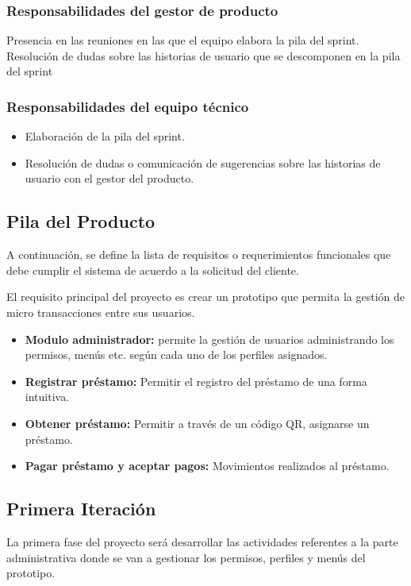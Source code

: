{{		\subsubsection{Responsabilidades del gestor de producto}
		{Presencia en las reuniones en las que el equipo elabora la pila del sprint. Resolución de dudas sobre las historias de usuario que se descomponen en la pila del sprint}
		
		\subsubsection{Responsabilidades del equipo técnico}
			\begin{itemize}
				\item Elaboración de la pila del sprint.
				\item Resolución de dudas o comunicación de sugerencias sobre las historias de usuario con el gestor del producto.
			\end{itemize}
	}

	\subsection{Pila del Producto}
	{A continuación, se define la lista de requisitos o requerimientos funcionales que debe cumplir el sistema de acuerdo a la solicitud del cliente.
		
	El requisito principal del proyecto es crear un prototipo que permita la gestión de micro transacciones entre sus usuarios.\\
		
		\begin{itemize}
			\item \textbf{Modulo administrador:} permite la gestión de usuarios administrando los permisos, menús etc. según cada uno de los perfiles asignados.
			\item \textbf{Registrar préstamo:} Permitir el registro del préstamo de una forma intuitiva.
			\item \textbf{Obtener préstamo:} Permitir a través de un código QR, asignarse un préstamo.
			\item \textbf{Pagar préstamo y aceptar pagos:} Movimientos realizados al préstamo.
		\end{itemize}
	
	}

	\subsection{Primera Iteración}
	{La primera fase del proyecto será desarrollar las actividades referentes a la parte administrativa donde se van a gestionar los permisos, perfiles y menús del prototipo.\\
	
}}

